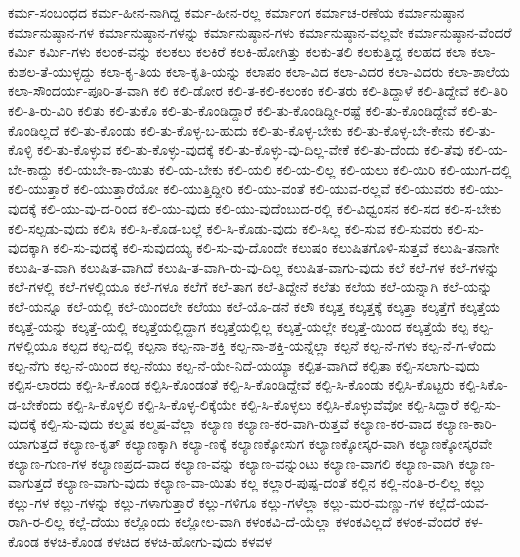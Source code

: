 {ಕರ್ಮ-ಸಂಬಂಧದ
ಕರ್ಮ-ಹೀನ-ನಾಗಿದ್ದ
ಕರ್ಮ-ಹೀನ-ರಲ್ಲ
ಕರ್ಮಾಂಗ
ಕರ್ಮಾಚ-ರಣೆಯ
ಕರ್ಮಾನುಷ್ಠಾನ
ಕರ್ಮಾನುಷ್ಠಾನ-ಗಳ
ಕರ್ಮಾನುಷ್ಠಾನ-ಗಳನ್ನು
ಕರ್ಮಾನುಷ್ಠಾನ-ಗಳು
ಕರ್ಮಾನುಷ್ಠಾನ-ವಲ್ಲವೇ
ಕರ್ಮಾನುಷ್ಠಾನ-ವೆಂದರೆ
ಕರ್ಮಿ
ಕರ್ಮಿ-ಗಳು
ಕಲಂಕ-ವನ್ನು
ಕಲಕಲು
ಕಲಕಿರೆ
ಕಲಕಿ-ಹೋಗಿತ್ತು
ಕಲಕು-ತಲಿ
ಕಲಕುತ್ತಿದ್ದ
ಕಲಹದ
ಕಲಾ
ಕಲಾ-ಕುಶಲ-ತೆ-ಯುಳ್ಳದ್ದು
ಕಲಾ-ಕೃ-ತಿಯ
ಕಲಾ-ಕೃತಿ-ಯನ್ನು
ಕಲಾಪಂ
ಕಲಾ-ವಿದ
ಕಲಾ-ವಿದರ
ಕಲಾ-ವಿದರು
ಕಲಾ-ಶಾಲೆಯ
ಕಲಾ-ಸೌಂದರ್ಯ-ಪೂರಿ-ತ-ವಾಗಿ
ಕಲಿ
ಕಲಿ-ಡೋರ
ಕಲಿ-ತ-ಕಲಿ-ಕಲಂಕಂ
ಕಲಿ-ತರು
ಕಲಿ-ತಿದ್ದಾಳೆ
ಕಲಿ-ತಿದ್ದೇವೆ
ಕಲಿ-ತಿರಿ
ಕಲಿ-ತಿ-ರು-ವಿರಿ
ಕಲಿತು
ಕಲಿ-ತುಕೊ
ಕಲಿ-ತು-ಕೊಂಡಿದ್ದಾರೆ
ಕಲಿ-ತು-ಕೊಂಡಿದ್ದೀ-ರಷ್ಟೆ
ಕಲಿ-ತು-ಕೊಂಡಿದ್ದೇವೆ
ಕಲಿ-ತು-ಕೊಂಡಿಲ್ಲದೆ
ಕಲಿ-ತು-ಕೊಂಡು
ಕಲಿ-ತು-ಕೊಳ್ಳ-ಬ-ಹುದು
ಕಲಿ-ತು-ಕೊಳ್ಳ-ಬೇಕು
ಕಲಿ-ತು-ಕೊಳ್ಳ-ಬೇ-ಕೇನು
ಕಲಿ-ತು-ಕೊಳ್ಳಿ
ಕಲಿ-ತು-ಕೊಳ್ಳುವ
ಕಲಿ-ತು-ಕೊಳ್ಳು-ವುದಕ್ಕೆ
ಕಲಿ-ತು-ಕೊಳ್ಳು-ವು-ದಿಲ್ಲ-ವೇಕೆ
ಕಲಿ-ತು-ದೆಂದು
ಕಲಿ-ತೆವು
ಕಲಿ-ಯ-ಬೇ-ಕಾದ್ದು
ಕಲಿ-ಯಬೇ-ಕಾ-ಯಿತು
ಕಲಿ-ಯ-ಬೇಕು
ಕಲಿ-ಯಲಿ
ಕಲಿ-ಯ-ಲಿಲ್ಲ
ಕಲಿ-ಯಲು
ಕಲಿ-ಯಿರಿ
ಕಲಿ-ಯುಗ-ದಲ್ಲಿ
ಕಲಿ-ಯುತ್ತಾರೆ
ಕಲಿ-ಯುತ್ತಾರೆಯೋ
ಕಲಿ-ಯುತ್ತಿದ್ದೀರಿ
ಕಲಿ-ಯು-ವಂತೆ
ಕಲಿ-ಯುವ-ರಲ್ಲವೆ
ಕಲಿ-ಯುವರು
ಕಲಿ-ಯು-ವುದಕ್ಕೆ
ಕಲಿ-ಯು-ವು-ದ-ರಿಂದ
ಕಲಿ-ಯು-ವುದು
ಕಲಿ-ಯು-ವುದೆಂಬುದ-ರಲ್ಲಿ
ಕಲಿ-ವಿಧ್ವಂಸನ
ಕಲಿ-ಸದ
ಕಲಿ-ಸ-ಬೇಕು
ಕಲಿ-ಸಲ್ಪಡು-ವುದು
ಕಲಿಸಿ
ಕಲಿ-ಸಿ-ಕೊಡ-ಬಲ್ಲೆ
ಕಲಿ-ಸಿ-ಕೊಡು-ವುದು
ಕಲಿ-ಸಿಲ್ಲ
ಕಲಿ-ಸುವ
ಕಲಿ-ಸುವರು
ಕಲಿ-ಸು-ವುದಕ್ಕಾಗಿ
ಕಲಿ-ಸು-ವುದಕ್ಕೆ
ಕಲಿ-ಸುವುದಯ್ಯ
ಕಲಿ-ಸು-ವು-ದೊಂದೇ
ಕಲುಷಂ
ಕಲುಷಿತಗೊಳಿ-ಸುತ್ತವೆ
ಕಲುಷಿ-ತನಾಗೇ
ಕಲುಷಿ-ತ-ವಾಗಿ
ಕಲುಷಿತ-ವಾಗಿದೆ
ಕಲುಷಿ-ತ-ವಾಗಿ-ರು-ವು-ದಿಲ್ಲ
ಕಲುಷಿತ-ವಾಗು-ವುದು
ಕಲೆ
ಕಲೆ-ಗಳ
ಕಲೆ-ಗಳನ್ನು
ಕಲೆ-ಗಳಲ್ಲಿ
ಕಲೆ-ಗಳಲ್ಲಿಯೂ
ಕಲೆ-ಗಳೂ
ಕಲೆಗೆ
ಕಲೆ-ತಾಗ
ಕಲೆ-ತಿದ್ದೇನೆ
ಕಲೆತು
ಕಲೆಯ
ಕಲೆ-ಯನ್ನಾಗಿ
ಕಲೆ-ಯನ್ನು
ಕಲೆ-ಯನ್ನೂ
ಕಲೆ-ಯಲ್ಲಿ
ಕಲೆ-ಯಿಂದಲೇ
ಕಲೆಯು
ಕಲೆ-ಯೊ-ಡನೆ
ಕಲೌ
ಕಲ್ಕತ್ತ
ಕಲ್ಕತ್ತಕ್ಕೆ
ಕಲ್ಕತ್ತಾ
ಕಲ್ಕತ್ತೆಗೆ
ಕಲ್ಕತ್ತೆಯ
ಕಲ್ಕತ್ತೆ-ಯನ್ನು
ಕಲ್ಕತ್ತೆ-ಯಲ್ಲಿ
ಕಲ್ಕತ್ತೆಯಲ್ಲಿದ್ದಾಗ
ಕಲ್ಕತ್ತೆಯಲ್ಲಿಲ್ಲ
ಕಲ್ಕತ್ತೆ-ಯಲ್ಲೇ
ಕಲ್ಕತ್ತೆ-ಯಿಂದ
ಕಲ್ಕತ್ತೆಯೆ
ಕಲ್ಪ
ಕಲ್ಪ-ಗಳಲ್ಲಿಯೂ
ಕಲ್ಪದ
ಕಲ್ಪ-ದಲ್ಲಿ
ಕಲ್ಪನಾ
ಕಲ್ಪ-ನಾ-ಶಕ್ತಿ
ಕಲ್ಪ-ನಾ-ಶಕ್ತಿ-ಯನ್ನೆಲ್ಲಾ
ಕಲ್ಪನೆ
ಕಲ್ಪ-ನೆ-ಗಳು
ಕಲ್ಪ-ನೆ-ಗ-ಳೆಂದು
ಕಲ್ಪ-ನೆಗು
ಕಲ್ಪ-ನೆ-ಯಿಂದ
ಕಲ್ಪ-ನೆಯು
ಕಲ್ಪ-ನೆ-ಯೇ-ನಿದೆ-ಯಯ್ಯಾ
ಕಲ್ಪಿತ-ವಾಗಿದೆ
ಕಲ್ಪಿತಾ
ಕಲ್ಪಿ-ಸಲಾಗು-ವುದು
ಕಲ್ಪಿಸ-ಲಾರದು
ಕಲ್ಪಿ-ಸಿ-ಕೊಂಡ
ಕಲ್ಪಿಸಿ-ಕೊಂಡಂತೆ
ಕಲ್ಪಿ-ಸಿ-ಕೊಂಡಿದ್ದೇವೆ
ಕಲ್ಪಿ-ಸಿ-ಕೊಂಡು
ಕಲ್ಪಿಸಿ-ಕೊಟ್ಟರು
ಕಲ್ಪಿ-ಸಿಕೊ-ಡ-ಬೇಕೆಂದು
ಕಲ್ಪಿ-ಸಿ-ಕೊಳ್ಳಲಿ
ಕಲ್ಪಿ-ಸಿ-ಕೊಳ್ಳ-ಲಿಕ್ಕೆಯೇ
ಕಲ್ಪಿ-ಸಿ-ಕೊಳ್ಳಲು
ಕಲ್ಪಿಸಿ-ಕೊಳ್ಳುವೆವೋ
ಕಲ್ಪಿ-ಸಿದ್ದಾರೆ
ಕಲ್ಪಿ-ಸು-ವುದಕ್ಕೆ
ಕಲ್ಪಿ-ಸು-ವುದು
ಕಲ್ಮಷ
ಕಲ್ಮಷ-ವೆಲ್ಲಾ
ಕಲ್ಯಾಣ
ಕಲ್ಯಾಣ-ಕರ-ವಾಗಿ-ರುತ್ತವೆ
ಕಲ್ಯಾಣ-ಕರ-ವಾದ
ಕಲ್ಯಾಣ-ಕಾರಿ-ಯಾಗುತ್ತದೆ
ಕಲ್ಯಾಣ-ಕೃತ್
ಕಲ್ಯಾಣಕ್ಕಾಗಿ
ಕಲ್ಯಾ-ಣಕ್ಕೆ
ಕಲ್ಯಾಣಕ್ಕೋಸುಗ
ಕಲ್ಯಾಣಕ್ಕೋಸ್ಕರ-ವಾಗಿ
ಕಲ್ಯಾಣಕ್ಕೋಸ್ಕರವೇ
ಕಲ್ಯಾಣ-ಗುಣ-ಗಳ
ಕಲ್ಯಾಣಪ್ರದ-ವಾದ
ಕಲ್ಯಾಣ-ವನ್ನು
ಕಲ್ಯಾಣ-ವನ್ನುಂಟು
ಕಲ್ಯಾಣ-ವಾಗಲಿ
ಕಲ್ಯಾಣ-ವಾಗಿ
ಕಲ್ಯಾಣ-ವಾಗುತ್ತದೆ
ಕಲ್ಯಾಣ-ವಾಗು-ವುದು
ಕಲ್ಯಾಣ-ವಾ-ಯಿತು
ಕಲ್ಲ
ಕಲ್ಲಾರ-ಪುಷ್ಪ-ದಂತೆ
ಕಲ್ಲಿನ
ಕಲ್ಲಿ-ನಂತಿ-ರ-ಲಿಲ್ಲ
ಕಲ್ಲು
ಕಲ್ಲು-ಗಳ
ಕಲ್ಲು-ಗಳನ್ನು
ಕಲ್ಲು-ಗಳಾಗುತ್ತಾರೆ
ಕಲ್ಲು-ಗಳಿಗೂ
ಕಲ್ಲು-ಗಳೆಲ್ಲಾ
ಕಲ್ಲು-ಮರ-ಮಣ್ಣು-ಗಳ
ಕಲ್ಲೆದೆ-ಯವ-ರಾಗಿ-ರ-ಲಿಲ್ಲ
ಕಲ್ಲೆ-ದೆಯು
ಕಲ್ಲೊಂದು
ಕಲ್ಲೋಲ-ವಾಗಿ
ಕಳಂಕವಿ-ದೆ-ಯೆಲ್ಲಾ
ಕಳಂಕವಿಲ್ಲದೆ
ಕಳಂಕ-ವೆಂದರೆ
ಕಳ-ಕೊಂಡ
ಕಳಚಿ-ಕೊಂಡ
ಕಳಚಿದ
ಕಳಚಿ-ಹೋಗು-ವುದು
ಕಳವಳ
}
